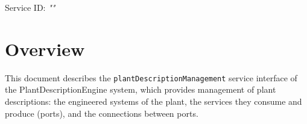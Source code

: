 \documentclass[a4paper]{arrowhead}
\begin{document}
\sloppy

\ArrowheadSetup

\begin{center}
  \vspace*{1cm}
  \huge{\arrowtitle}

  \vspace*{0.2cm}
  \LARGE{\arrowtype}
  \vspace*{1cm}

  \Large{Service ID: \textit{"\arrowid"}}

  \vspace*{\fill}


  \vspace*{1cm}
  \vspace*{\fill}

  \begin{abstract}
    This document describes the HTTP/1.1 protocol with TLS payload security and JSON payload encoding variant of the \texttt{plant\allowbreak{}Description\allowbreak{}Management} service of the PlantDescriptionEngine system.
  \end{abstract}

  \vspace*{1cm}
\end{center}

\newpage

\tableofcontents
\newpage

\section{Overview}
\label{sec:overview}

This document describes the \texttt{plant\allowbreak{}Description\allowbreak{}Management} service interface of the PlantDescriptionEngine system, which provides management of plant descriptions: the engineered systems of the plant, the services they consume and produce (ports), and the connections between ports.
\end{document}
